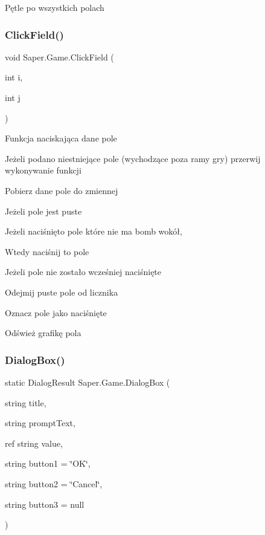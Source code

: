 Pętle po wszystkich polach \mbox{\label{class_saper_1_1_game_a87c8f7562e380781913a182aab6e093d}} 
\subsubsection{\texorpdfstring{ClickField()}{ClickField()}}
{\footnotesize\ttfamily void Saper.\+Game.\+Click\+Field (\begin{DoxyParamCaption}\item[{int}]{i,  }\item[{int}]{j }\end{DoxyParamCaption})}

Funkcja naciskająca dane pole

Jeżeli podano niestniejące pole (wychodzące poza ramy gry) przerwij wykonywanie funkcji

Pobierz dane pole do zmiennej

Jeżeli pole jest puste

Jeżeli naciśnięto pole które nie ma bomb wokół,

Wtedy naciśnij to pole

Jeżeli pole nie zostało wcześniej naciśnięte

Odejmij puste pole od licznika

Oznacz pole jako naciśnięte

Odśwież grafikę pola \mbox{\label{class_saper_1_1_game_a807f8f51c7b6f8b63382b7eb098b5fab}} 
\subsubsection{\texorpdfstring{DialogBox()}{DialogBox()}}
{\footnotesize\ttfamily static Dialog\+Result Saper.\+Game.\+Dialog\+Box (\begin{DoxyParamCaption}\item[{string}]{title,  }\item[{string}]{prompt\+Text,  }\item[{ref string}]{value,  }\item[{string}]{button1 = {\ttfamily \char`\"{}OK\char`\"{}},  }\item[{string}]{button2 = {\ttfamily \char`\"{}Cancel\char`\"{}},  }\item[{string}]{button3 = {\ttfamily null} }\end{DoxyParamCaption})\hspace{0.3cm}{\ttfamily [static]}}

